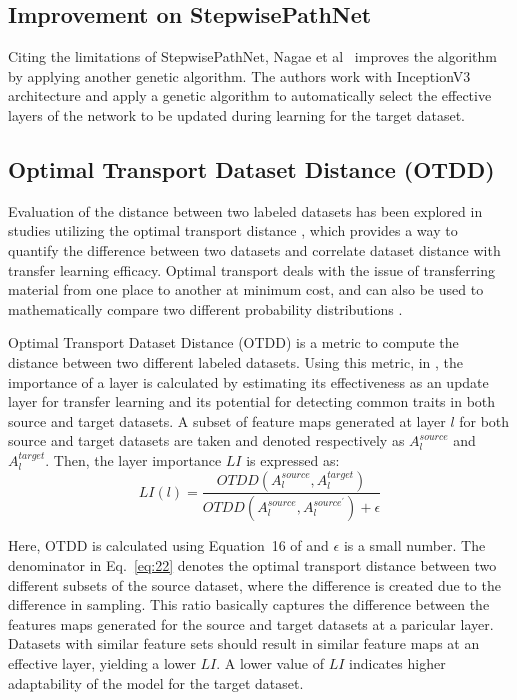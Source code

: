 \documentclass[a4paper,fleqn]{cas-sc}
\begin{document}
\subsection{Improvement on StepwisePathNet}

Citing the limitations of StepwisePathNet, Nagae et al~\cite{Nagae2022} improves the algorithm by applying another genetic algorithm. The authors work with InceptionV3 architecture \cite{szegedy2016rethinking} and apply a genetic algorithm to automatically select the effective layers of the network to be updated during learning for the target dataset.

\subsection{Optimal Transport Dataset Distance (OTDD)}
Evaluation of the distance between two labeled datasets has been explored in studies utilizing the optimal transport distance \cite{DavidNicolo2020}, which provides a way to quantify the difference between two datasets and correlate dataset distance with transfer learning efficacy. Optimal transport deals with the issue of transferring material from one place to another at minimum cost, and can also be used to mathematically compare two different probability distributions \cite{Villani2008}. %

Optimal Transport Dataset Distance (OTDD) \cite{DavidNicolo2020} is a metric to compute the distance between two different labeled datasets. Using this metric, in \cite{Nagae2022}, the importance of a layer is calculated by estimating its effectiveness as an update layer for transfer learning and its potential for detecting common traits in both source and target datasets. A subset of feature maps generated at layer $l$ for both source and target datasets are taken and denoted respectively as $A_l^{source}$ and $A_l^{target}$. Then, the layer importance $LI$ is expressed as:
\begin{equation}
\label{eq:22}
LI(l) = \frac{OTDD(A_l^{source}, A_l^{target})}{OTDD(A_l^{source}, A_l^{source^\prime}) + \epsilon}
\end{equation}

Here, OTDD is calculated using Equation~16 of \cite{Nagae2022} and $\epsilon$ is a small number. The denominator in Eq.~\ref{eq:22} denotes the optimal transport distance between two different subsets of the source dataset, where the difference is created due to the difference in sampling. This ratio basically captures the difference between the features maps generated for the source and target datasets at a paricular layer. Datasets with similar feature sets should result in similar feature maps at an effective layer, yielding a lower $LI$. A lower value of $LI$ indicates higher adaptability of the model for the target dataset.
\end{document}
